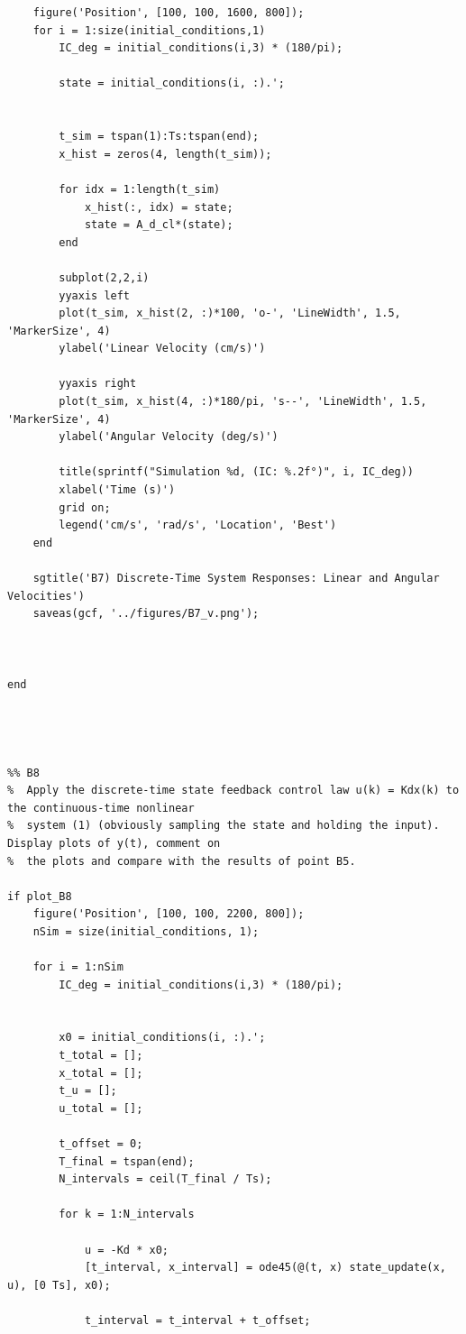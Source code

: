 \documentclass{article}
\begin{document}
\begin{verbatim}
    figure('Position', [100, 100, 1600, 800]);
    for i = 1:size(initial_conditions,1)
        IC_deg = initial_conditions(i,3) * (180/pi);

        state = initial_conditions(i, :).';


        t_sim = tspan(1):Ts:tspan(end);
        x_hist = zeros(4, length(t_sim));

        for idx = 1:length(t_sim)
            x_hist(:, idx) = state; 
            state = A_d_cl*(state); 
        end

        subplot(2,2,i)
        yyaxis left
        plot(t_sim, x_hist(2, :)*100, 'o-', 'LineWidth', 1.5, 'MarkerSize', 4)
        ylabel('Linear Velocity (cm/s)')

        yyaxis right
        plot(t_sim, x_hist(4, :)*180/pi, 's--', 'LineWidth', 1.5, 'MarkerSize', 4)
        ylabel('Angular Velocity (deg/s)')
        
        title(sprintf("Simulation %d, (IC: %.2f°)", i, IC_deg))
        xlabel('Time (s)')
        grid on;
        legend('cm/s', 'rad/s', 'Location', 'Best')
    end
    
    sgtitle('B7) Discrete-Time System Responses: Linear and Angular Velocities')
    saveas(gcf, '../figures/B7_v.png');



end




%% B8
%  Apply the discrete-time state feedback control law u(k) = Kdx(k) to the continuous-time nonlinear
%  system (1) (obviously sampling the state and holding the input). Display plots of y(t), comment on
%  the plots and compare with the results of point B5.

if plot_B8
    figure('Position', [100, 100, 2200, 800]);
    nSim = size(initial_conditions, 1);
    
    for i = 1:nSim
        IC_deg = initial_conditions(i,3) * (180/pi);


        x0 = initial_conditions(i, :).';
        t_total = [];
        x_total = [];
        t_u = []; 
        u_total = []; 
        
        t_offset = 0;
        T_final = tspan(end); 
        N_intervals = ceil(T_final / Ts);
        
        for k = 1:N_intervals

            u = -Kd * x0;
            [t_interval, x_interval] = ode45(@(t, x) state_update(x, u), [0 Ts], x0);
           
            t_interval = t_interval + t_offset;


\end{verbatim}
\end{document}
